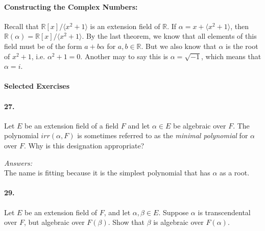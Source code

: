 \documentclass[10pt,a4paper]{article}
\begin{document}
\paragraph{Constructing the Complex Numbers:} Recall that $\mathbb{R}[x]/\langle x^2 +1 \rangle $ is an extension field of $\mathbb{R}$. If $\alpha = x + \langle x^2 +1 \rangle$, then $\mathbb{R}(\alpha) = \mathbb{R}[x]/ \langle x^2 +1 \rangle$. By the last theorem, we know that all elements of this field must be of the form $a+b\alpha$ for $a,b \in \mathbb{R}$. But we also know that $\alpha$ is the root of $x^2+1$, i.e. $\alpha^2 + 1 = 0$. Another may to say this is $\alpha = \sqrt{-1}$, which means that $\alpha = i$.

\paragraph{Selected Exercises}

\paragraph{27.} Let $E$ be an extension field of a field $F$ and let $\alpha \in E$ be algebraic over $F$. The polynomial $irr(\alpha, F)$ is sometimes referred to as the \textit{minimal polynomial} for $\alpha$ over $F$. Why is this designation appropriate?

\begin{flushleft}
\textit{Answers:}\\
 The name is fitting because it is the simplest polynomial that has $\alpha$ as a root.
\end{flushleft}

\paragraph{29.} Let $E$ be an extension field of $F$, and let $\alpha, \beta \in E$. Suppose $\alpha$ is transcendental over $F$, but algebraic over $F(\beta)$. Show that $\beta$ is algebraic over $F(\alpha)$.
\end{document}
